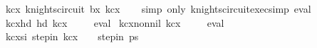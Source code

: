 \begin{isabellebody}
\isamarkupfalse%
\ kc{\isacharunderscore}{\kern0pt}{}x{}{\isacharcolon}{\kern0pt}\ {\isachardoublequoteopen}knights{\isacharunderscore}{\kern0pt}circuit\ b{}x{}\ kc{}x{}{\isachardoublequoteclose}\isanewline
%
\isadelimproof
\ \ %
\endisadelimproof
%
\isatagproof
{}\isamarkupfalse%
\ {\isacharparenleft}{\kern0pt}simp\ only{\isacharcolon}{\kern0pt}\ knights{\isacharunderscore}{\kern0pt}circuit{\isacharunderscore}{\kern0pt}exec{\isacharunderscore}{\kern0pt}simp{\isacharparenright}{\kern0pt}\ eval%
\endisatagproof
{\isafoldproof}%
%
\isadelimproof
\isanewline
%
\endisadelimproof
\isanewline
{}\isamarkupfalse%
\ kc{\isacharunderscore}{\kern0pt}{}x{}{\isacharunderscore}{\kern0pt}hd{\isacharcolon}{\kern0pt}\ {\isachardoublequoteopen}hd\ kc{}x{}\ {\isacharequal}{\kern0pt}\ {\isacharparenleft}{\kern0pt}{}{\isacharcomma}{\kern0pt}{}{\isacharparenright}{\kern0pt}{\isachardoublequoteclose}%
\isadelimproof
\ %
\endisadelimproof
%
\isatagproof
{}\isamarkupfalse%
\ eval%
\endisatagproof
{\isafoldproof}%
%
\isadelimproof
%
\endisadelimproof
\isanewline
\isanewline
{}\isamarkupfalse%
\ kc{\isacharunderscore}{\kern0pt}{}x{}{\isacharunderscore}{\kern0pt}non{\isacharunderscore}{\kern0pt}nil{\isacharcolon}{\kern0pt}\ {\isachardoublequoteopen}kc{}x{}\ {\isasymnoteq}\ {\isacharbrackleft}{\kern0pt}{\isacharbrackright}{\kern0pt}{\isachardoublequoteclose}%
\isadelimproof
\ %
\endisadelimproof
%
\isatagproof
{}\isamarkupfalse%
\ eval%
\endisatagproof
{\isafoldproof}%
%
\isadelimproof
%
\endisadelimproof
\isanewline
\isanewline
{}\isamarkupfalse%
\ kc{\isacharunderscore}{\kern0pt}{}x{}{\isacharunderscore}{\kern0pt}si{\isacharcolon}{\kern0pt}\ {\isachardoublequoteopen}step{\isacharunderscore}{\kern0pt}in\ kc{}x{}\ {\isacharparenleft}{\kern0pt}{}{\isacharcomma}{\kern0pt}{}{\isacharparenright}{\kern0pt}\ {\isacharparenleft}{\kern0pt}{}{\isacharcomma}{\kern0pt}{}{\isacharparenright}{\kern0pt}{\isachardoublequoteclose}\ {\isacharparenleft}{\kern0pt}\ {\isachardoublequoteopen}step{\isacharunderscore}{\kern0pt}in\ {\isacharquery}{\kern0pt}ps\ {\isacharunderscore}{\kern0pt}\ {\isacharunderscore}{\kern0pt}{\isachardoublequoteclose}{\isacharparenright}{\kern0pt}\isanewline
%
\isadelimproof
%

\end{isabellebody}
